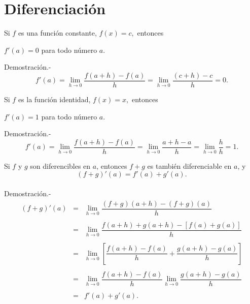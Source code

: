 \chapter{Diferenciación}

\begin{teo}
    Si $f$ es una función constante, $f(x)=c,$ entonces
    \begin{center}
	$f'(a)=0$ para todo número $a$.
    \end{center}
    \vspace{.5cm}
	Demostración.-\; $$f'(a)=\lim\limits_{h\to 0}\dfrac{f(a+h)-f(a)}{h}=\lim\limits_{h\to 0}\dfrac{(c+h)-c}{h}=0.$$
\end{teo}

\begin{teo}
    Si $f$ es la función identidad, $f(x)=x,$ entonces
    \begin{center}
	$f'(a)=1$ para todo número $a$.
    \end{center}
    \vspace{.5cm}
	Demostración.-\;
	$$f'(a)=\lim_{h\to 0}\dfrac{f(a+h)-f(a)}{h}=\lim\limits_{h\to 0}\dfrac{a+h-a}{h}=\lim_{h\to 0}\dfrac{h}{h}=1.$$
\end{teo}

\begin{teo}
    Si $f$ y $g$ son diferencibles en $a$, entonces $f+g$ es también diferenciable en $a$, y
    $$(f+g)'(a)=f'(a)+g'(a).$$\\
	Demostración.-\; 
	$$\begin{array}{rcl}
	    (f+g)'(a) &=& \lim\limits_{h\to 0} \dfrac{(f+g)(a+h)-(f+g)(a)}{h}\\\\
		      &=& \lim\limits_{h\to 0} \dfrac{f(a+h)+g(a+h)-\left[f(a)+g(a)\right]}{h}\\\\
		      &=& \lim\limits_{h\to 0} \left[\dfrac{f(a+h)-f(a)}{h}+\dfrac{g(a+h)-g(a)}{h}\right]\\\\
		      &=& \lim\limits_{h\to 0} \dfrac{f(a+h)-f(a)}{h} \lim\limits_{h\to 0}\dfrac{g(a+h)-g(a)}{h}\\\\
		      &=& f'(a)+g'(a).\\\\
	\end{array}$$
\end{teo}

